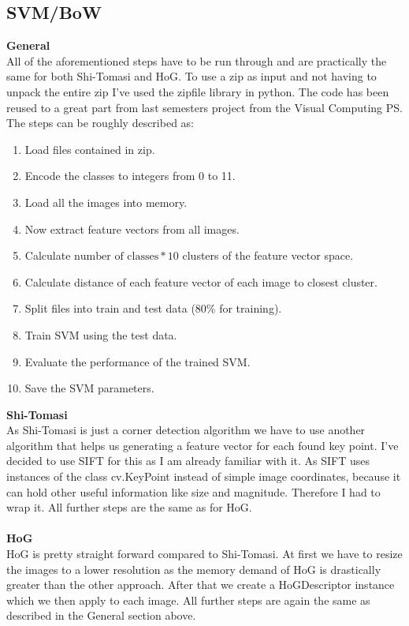 \documentclass[UTF-8]{article}
\begin{document}
\subsection{SVM/BoW}
\textbf{General}\\
All of the aforementioned steps have to be run through and are practically the same for both Shi-Tomasi and HoG. To use a zip as input and not having to unpack the entire zip I've used the zipfile library in python. The code has been reused to a great part from last semesters project from the Visual Computing PS. 
The steps can be roughly described as:
\begin{enumerate}
	\item Load files contained in zip.
	\item Encode the classes to integers from 0 to 11.
	\item Load all the images into memory.
	\item Now extract feature vectors from all images.
	\item Calculate $ \text{number of classes} * 10$ clusters of the feature vector space.
	\item Calculate distance of each feature vector of each image to closest cluster.
	\item Split files into train and test data (80\% for training).
	\item Train SVM using the test data.
	\item Evaluate the performance of the trained SVM.
	\item Save the SVM parameters.
\end{enumerate}
\textbf{Shi-Tomasi}\\
As Shi-Tomasi is just a corner detection algorithm we have to use another algorithm that helps us generating a feature vector for each found key point. I've decided to use SIFT for this as I am already familiar with it. As SIFT uses instances of the class cv.KeyPoint instead of simple image coordinates, because it can hold other useful information like size and magnitude. Therefore I had to wrap it.
All further steps are the same as for HoG.\\\\
\textbf{HoG}\\
HoG is pretty straight forward compared to Shi-Tomasi. At first we have to resize the images to a lower resolution as the memory demand of HoG is drastically greater than the other approach. After that we create a HoGDescriptor instance which we then apply to each image. All further steps are again the same as described in the General section above.
\end{document}
